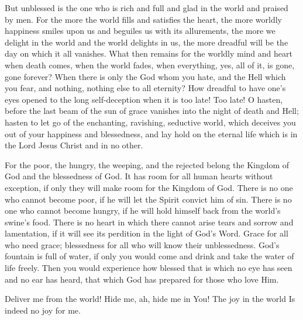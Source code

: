 But unblessed is the one who is rich and full and glad in the world and praised by men. For the more the world fills and satisfies the heart, the more worldly happiness smiles upon us and beguiles us with its allurements, the more we delight in the world and the world delights in us, the more dreadful will be the day on which it all vanishes. What then remains for the worldly mind and heart when death comes, when the world fades, when everything, yes, all of it, is gone, gone forever? When there is only the God whom you hate, and the Hell which you fear, and nothing, nothing else to all eternity? How dreadful to have one’s eyes opened to the long self-deception when it is too late! Too late! O hasten, before the last beam of the sun of grace vanishes into the night of death and Hell; hasten to let go of the enchanting, ravishing, seductive world, which deceives you out of your happiness and blessedness, and lay hold on the eternal life which is in the Lord Jesus Christ and in no other.

For the poor, the hungry, the weeping, and the rejected belong the Kingdom of God and the blessedness of God. It has room for all human hearts without exception, if only they will make room for the Kingdom of God. There is no one who cannot become poor, if he will let the Spirit convict him of sin. There is no one who cannot become hungry, if he will hold himself back from the world’s swine’s food. There is no heart in which there cannot arise tears and sorrow and lamentation, if it will see its perdition in the light of God’s Word. Grace for all who need grace; blessedness for all who will know their unblessedness. God’s fountain is full of water, if only you would come and drink and take the water of life freely. Then you would experience how blessed that is which no eye has seen and no ear has heard, that which God has prepared for those who love Him.

Deliver me from the world!
Hide me, ah, hide me in You!
The joy in the world
Is indeed no joy for me.

